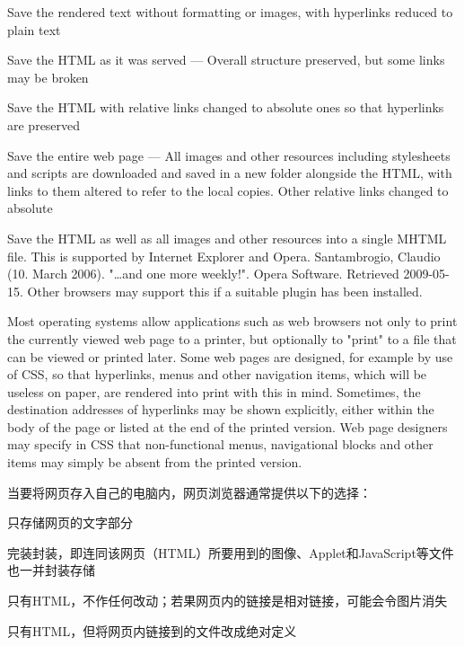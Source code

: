 \begin{compactitem}
\item Save the rendered text without formatting or images, with hyperlinks reduced to plain text
\item Save the HTML as it was served — Overall structure preserved, but some links may be broken
\item Save the HTML with relative links changed to absolute ones so that hyperlinks are preserved
\item Save the entire web page — All images and other resources including stylesheets and scripts are downloaded and saved in a new folder alongside the HTML, with links to them altered to refer to the local copies. Other relative links changed to absolute
\item Save the HTML as well as all images and other resources into a single MHTML file. This is supported by Internet Explorer and Opera. Santambrogio, Claudio (10. March 2006). "…and one more weekly!". Opera Software. Retrieved 2009-05-15. Other browsers may support this if a suitable plugin has been installed.

\end{compactitem}

Most operating systems allow applications such as web browsers not only to print the currently viewed web page to a printer, but optionally to "print" to a file that can be viewed or printed later. Some web pages are designed, for example by use of CSS, so that hyperlinks, menus and other navigation items, which will be useless on paper, are rendered into print with this in mind. Sometimes, the destination addresses of hyperlinks may be shown explicitly, either within the body of the page or listed at the end of the printed version. Web page designers may specify in CSS that non-functional menus, navigational blocks and other items may simply be absent from the printed version.

当要将网页存入自己的电脑内，网页浏览器通常提供以下的选择：

\begin{compactitem}
\item 只存储网页的文字部分
\item 完装封装，即连同该网页（HTML）所要用到的图像、Applet和JavaScript等文件也一并封装存储
\item 只有HTML，不作任何改动；若果网页内的链接是相对链接，可能会令图片消失
\item 只有HTML，但将网页内链接到的文件改成绝对定义
\end{compactitem}

